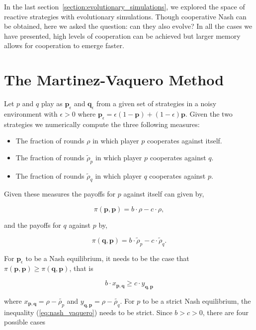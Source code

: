 \documentclass{article}
\theoremstyle{definition}
\begin{document}
In the last section~\ref{section:evolutionary_simulations}, we explored the
space of reactive strategies with evolutionary simulations. Though cooperative
Nash can be obtained, here we asked the question: can they also evolve? In all
the cases we have presented, high levels of cooperation can be achieved but
larger memory allows for cooperation to emerge faster.


\appendix

\section{The Martinez-Vaquero Method}\label{section:matrinez_vaquero_method}

Let \(p\) and \(q\) play as \(\mathbf{p}_{\epsilon}\) and
\(\mathbf{q}_{\epsilon}\) from a given set of strategies in a noisy environment
with \(\epsilon > 0\) where \(\mathbf{p}_{\epsilon} = \epsilon(1 \!- \!\mathbf{p}) +
(1 \!- \!\epsilon)\mathbf{p} \). Given the two strategies we numerically compute
the three following measures:


\begin{itemize}
  \item The fraction of rounds \(\rho\) in which player \(p\) cooperates against itself.
  \item The fraction of rounds \(\tilde{\rho}_p\) in which player \(p\) cooperates against \(q\).
  \item The fraction of rounds \(\tilde{\rho}_q\) in which player \(q\) cooperates against \(p\).
\end{itemize}

Given these measures the payoffs for \(p\) against itself can given by,

\[\pi (\mathbf{p}, \mathbf{p}) = b \cdot \rho \!- \!c\cdot\rho,\]

and the payoffs for \(q\) against \(p\) by,

\[\pi(\mathbf{q}, \mathbf{p}) = b \cdot \tilde{\rho}_p \!- \!c\cdot\tilde{\rho}_q.\]

For \(\mathbf{p}_{\epsilon}\) to be a Nash equilibrium, it needs to be the case that \(\pi (\mathbf{p}, \mathbf{p}) \geq
\pi(\mathbf{q}, \mathbf{p})\), that is

\begin{equation}\label{eq:nash_vaquero}
  b \cdot x_{\mathbf{p}, \mathbf{q}} \geq c \cdot y_{\mathbf{q}, \mathbf{p}}
\end{equation}

where \(x_{\mathbf{p}, \mathbf{q}} = \rho \!- \!\tilde{\rho_p}\) and  \(y_{\mathbf{q}, \mathbf{p}} = \rho \!- \!\tilde{\rho_q}\).
For \(p\) to be a strict Nash equilibrium, the inequality (\ref{eq:nash_vaquero}) needs
to be strict. Since \(b > c > 0\), there are four possible cases
\end{document}
